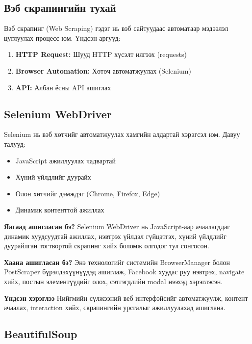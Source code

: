 \documentclass[12pt,a4paper]{report}
\begin{document}
\subsection{Вэб скрапингийн тухай}

Вэб скрапинг (Web Scraping) гэдэг нь вэб сайтуудаас автоматаар мэдээлэл цуглуулах процесс юм. Үндсэн аргууд:

\begin{enumerate}
    \item \textbf{HTTP Request:} Шууд HTTP хүсэлт илгээх (requests)
    \item \textbf{Browser Automation:} Хөтөч автоматжуулах (Selenium)
    \item \textbf{API:} Албан ёсны API ашиглах
\end{enumerate}

\subsection{Selenium WebDriver}

Selenium нь вэб хөтчийг автоматжуулах хамгийн алдартай хэрэгсэл юм. Давуу талууд:

\begin{itemize}
    \item JavaScript ажиллуулах чадвартай
    \item Хүний үйлдлийг дуурайх
    \item Олон хөтчийг дэмждэг (Chrome, Firefox, Edge)
    \item Динамик контенттой ажиллах
\end{itemize}


\textbf{Яагаад ашигласан бэ?} Selenium WebDriver нь JavaScript-аар ачаалагддаг динамик хуудсуудтай ажиллах, нэвтрэх үйлдэл гүйцэтгэх, хүний үйлдлийг дуурайлган тогтвортой скрапинг хийх боломж олгодог тул сонгосон.

\textbf{Хаана ашигласан бэ?} Энэ технологийг системийн BrowserManager болон PostScraper бүрэлдэхүүнүүдэд ашиглаж, Facebook хуудас руу нэвтрэх, navigate хийх, постын элементүүдийг олох, сэтгэгдлийн modal нээхэд хэрэглэсэн.

\textbf{Үндсэн хэрэглээ} Нийгмийн сүлжээний веб интерфэйсийг автоматжуулж, контент ачаалах, interaction хийх, скрапингийн урсгалыг ажиллуулахад ашиглана.

\subsection{BeautifulSoup}
\end{document}

